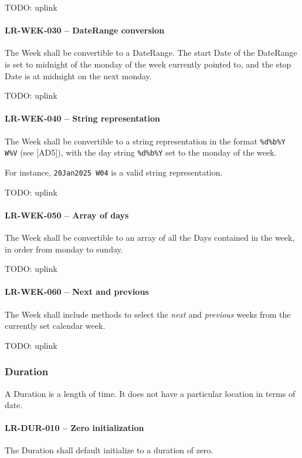 TODO: uplink

\paragraph{LR-WEK-030 -- DateRange conversion}
The Week shall be convertible to a DateRange. The start Date of the DateRange
is set to midnight of the monday of the week currently pointed to, and the
stop Date is at midnight on the next monday.

TODO: uplink

\paragraph{LR-WEK-040 -- String representation}
The Week shall be convertible to a string representation in the format
\lstinline{%d%b%Y W%V} (see [AD5]), with the day string \lstinline{%d%b%Y}
set to the monday of the week.

For instance, \lstinline{20Jan2025 W04} is a valid string representation.

TODO: uplink

\paragraph{LR-WEK-050 -- Array of days}
The Week shall be convertible to an array of all the Days contained
in the week, in order from monday to sunday.

TODO: uplink
  
\paragraph{LR-WEK-060 -- Next and previous}
The Week shall include methods to select the \emph{next} and \emph{previous}
weeks from the currently set calendar week.

TODO: uplink

\subsubsection{Duration}
A Duration is a length of time. It does not have a particular location
in terms of date.

\paragraph{LR-DUR-010 -- Zero initialization}
The Duration shall default initialize to a duration of zero.

